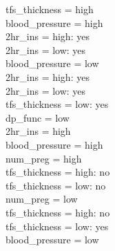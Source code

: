 \documentclass[12pt]{article}
\begin{document}
\textbar\quad \textbar\quad \textbar\quad \textbar\quad \textbar\quad tfs\_thickness = high\\
\textbar\quad \textbar\quad \textbar\quad \textbar\quad \textbar\quad \textbar\quad blood\_pressure = high\\
\textbar\quad \textbar\quad \textbar\quad \textbar\quad \textbar\quad \textbar\quad \textbar\quad 2hr\_ins = high: yes\\
\textbar\quad \textbar\quad \textbar\quad \textbar\quad \textbar\quad \textbar\quad \textbar\quad 2hr\_ins = low: yes\\
\textbar\quad \textbar\quad \textbar\quad \textbar\quad \textbar\quad \textbar\quad blood\_pressure = low\\
\textbar\quad \textbar\quad \textbar\quad \textbar\quad \textbar\quad \textbar\quad \textbar\quad 2hr\_ins = high: yes\\
\textbar\quad \textbar\quad \textbar\quad \textbar\quad \textbar\quad \textbar\quad \textbar\quad 2hr\_ins = low: yes\\
\textbar\quad \textbar\quad \textbar\quad \textbar\quad \textbar\quad tfs\_thickness = low: yes\\
\textbar\quad \textbar\quad \textbar\quad dp\_func = low\\
\textbar\quad \textbar\quad \textbar\quad \textbar\quad 2hr\_ins = high\\
\textbar\quad \textbar\quad \textbar\quad \textbar\quad \textbar\quad blood\_pressure = high\\
\textbar\quad \textbar\quad \textbar\quad \textbar\quad \textbar\quad \textbar\quad num\_preg = high\\
\textbar\quad \textbar\quad \textbar\quad \textbar\quad \textbar\quad \textbar\quad \textbar\quad tfs\_thickness = high: no\\
\textbar\quad \textbar\quad \textbar\quad \textbar\quad \textbar\quad \textbar\quad \textbar\quad tfs\_thickness = low: no\\
\textbar\quad \textbar\quad \textbar\quad \textbar\quad \textbar\quad \textbar\quad num\_preg = low\\
\textbar\quad \textbar\quad \textbar\quad \textbar\quad \textbar\quad \textbar\quad \textbar\quad tfs\_thickness = high: no\\
\textbar\quad \textbar\quad \textbar\quad \textbar\quad \textbar\quad \textbar\quad \textbar\quad tfs\_thickness = low: yes\\
\textbar\quad \textbar\quad \textbar\quad \textbar\quad \textbar\quad blood\_pressure = low\\
\end{document}
